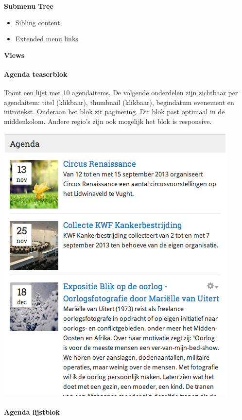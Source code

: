 \textbf{Submenu Tree}

\begin{itemize}
\item Sibling content
\item Extended menu links
\end{itemize}

\textbf{Views}

\paragraph{Agenda teaserblok}

Toont een lijst met 10 agendaitems. De volgende onderdelen zijn zichtbaar per agendaitem: titel (klikbaar), thumbnail (klikbaar), begindatum evenement en introtekst. Onderaan het blok zit paginering. Dit blok past optimaal in de middenkolom. Andere regio's zijn ook mogelijk het blok is responsive.

\begin{center}
	\includegraphics[scale=0.5]{img/blokken/agendateaser.png}
\end{center}

\paragraph{Agenda lijstblok}

